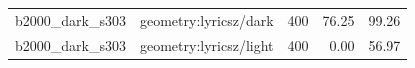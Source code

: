 \begin{longtable}{l>{\raggedright\arraybackslash}p{.42\linewidth}rrr}
b2000\_\allowbreak{}dark\_\allowbreak{}s303 & %
geometry:lyricsz/dark & %
400 & %
76.25 & %
99.26 \\ %

b2000\_\allowbreak{}dark\_\allowbreak{}s303 & %
geometry:lyricsz/light & %
400 & %
0.00 & %
56.97 \\ %


\end{longtable}
